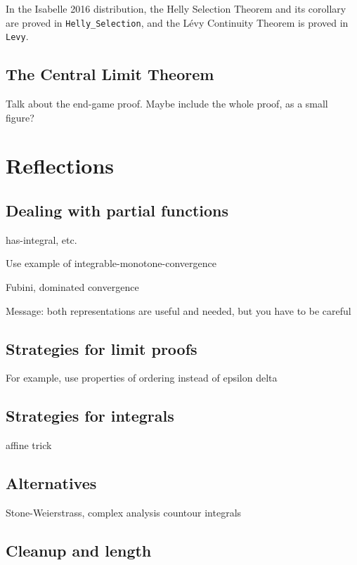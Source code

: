 \documentclass{svjour3}
\newcommand{\todo}[1]{{\color{red}#1}}
\begin{document}
In the Isabelle 2016 distribution, the Helly Selection Theorem and its corollary are proved in \verb=Helly_Selection=, and the L\'evy Continuity Theorem is proved in \verb=Levy=.

\subsection{The Central Limit Theorem}

\todo{Talk about the end-game proof. Maybe include the whole proof, as a small figure?}

\section{Reflections}
\label{section:reflections}

\subsection{Dealing with partial functions}

\todo{
has-integral, etc.

Use example of integrable-monotone-convergence



Fubini, dominated convergence

Message: both representations are useful and needed, but you have to be careful
}

\subsection{Strategies for limit proofs}

\todo{
For example, use properties of ordering instead of epsilon delta
}

\subsection{Strategies for integrals}

\todo{
affine trick
}

\subsection{Alternatives}

\todo{
Stone-Weierstrass, complex analysis countour integrals
}

\subsection{Cleanup and length}
\end{document}

